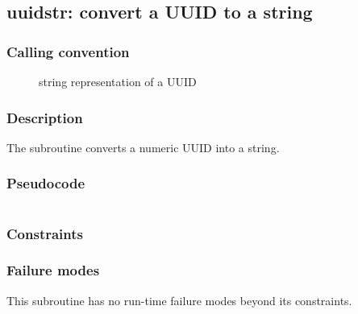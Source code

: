 \clearpage
{}
{}
\label{subr:uuidstr}
\subsection*{uuidstr: convert a UUID to a string}

\subsubsection*{Calling convention}

\begin{description}
\item[] string representation of a UUID
\end{description}

\subsubsection*{Description}

The  subroutine converts a numeric UUID into a string.
\subsubsection*{Pseudocode}

\begin{verbatim}
\end{verbatim}

\subsubsection*{Constraints}

\subsubsection*{Failure modes}

This subroutine has no run-time failure modes beyond its constraints.
